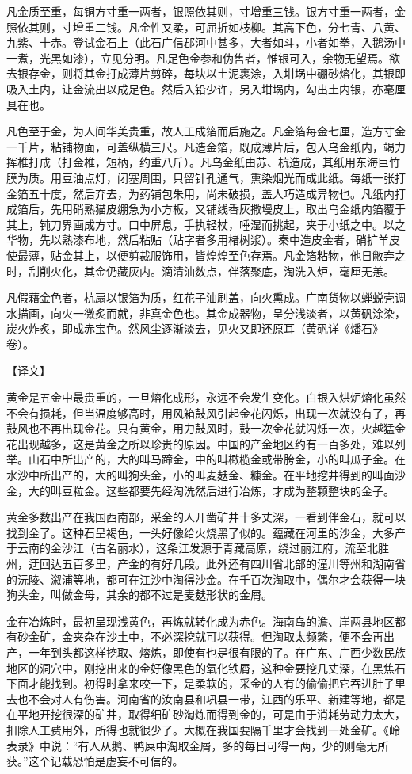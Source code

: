 \documentclass[12pt,UTF8]{ctexbook}
\begin{document}
凡金质至重，每铜方寸重一两者，银照依其则，寸增重三钱。银方寸重一两者，金照依其则，寸增重二钱。凡金性又柔，可屈折如枝柳。其高下色，分七青、八黄、九紫、十赤。登试金石上（此石广信郡河中甚多，大者如斗，小者如拳，入鹅汤中一煮，光黑如漆），立见分明。凡足色金参和伪售者，惟银可入，余物无望焉。欲去银存金，则将其金打成薄片剪碎，每块以土泥裹涂，入坩埚中硼砂熔化，其银即吸入土内，让金流出以成足色。然后入铅少许，另入坩埚内，勾出土内银，亦毫厘具在也。

凡色至于金，为人间华美贵重，故人工成箔而后施之。凡金箔每金七厘，造方寸金一千片，粘铺物面，可盖纵横三尺。凡造金箔，既成薄片后，包入乌金纸内，竭力挥椎打成（打金椎，短柄，约重八斤）。凡乌金纸由苏、杭造成，其纸用东海巨竹膜为质。用豆油点灯，闭塞周围，只留针孔通气，熏染烟光而成此纸。每纸一张打金箔五十度，然后弃去，为药铺包朱用，尚未破损，盖人巧造成异物也。凡纸内打成箔后，先用硝熟猫皮绷急为小方板，又铺线香灰撒墁皮上，取出乌金纸内箔覆于其上，钝刀界画成方寸。口中屏息，手执轻杖，唾湿而挑起，夹于小纸之中。以之华物，先以熟漆布地，然后粘贴（贴字者多用楮树浆）。秦中造皮金者，硝扩羊皮使最薄，贴金其上，以便剪裁服饰用，皆煌煌至色存焉。凡金箔粘物，他日敝弃之时，刮削火化，其金仍藏灰内。滴清油数点，伴落聚底，淘洗入炉，毫厘无恙。

凡假藉金色者，杭扇以银箔为质，红花子油刷盖，向火熏成。广南货物以蝉蜕壳调水描画，向火一微炙而就，非真金色也。其金成器物，呈分浅淡者，以黄矾涂染，炭火炸炙，即成赤宝色。然风尘逐渐淡去，见火又即还原耳（黄矾详《燔石》卷）。

【译文】

黄金是五金中最贵重的，一旦熔化成形，永远不会发生变化。白银入烘炉熔化虽然不会有损耗，但当温度够高时，用风箱鼓风引起金花闪烁，出现一次就没有了，再鼓风也不再出现金花。只有黄金，用力鼓风时，鼓一次金花就闪烁一次，火越猛金花出现越多，这是黄金之所以珍贵的原因。中国的产金地区约有一百多处，难以列举。山石中所出产的，大的叫马蹄金，中的叫橄榄金或带胯金，小的叫瓜子金。在水沙中所出产的，大的叫狗头金，小的叫麦麸金、糠金。在平地挖井得到的叫面沙金，大的叫豆粒金。这些都要先经淘洗然后进行冶炼，才成为整颗整块的金子。

黄金多数出产在我国西南部，采金的人开凿矿井十多丈深，一看到伴金石，就可以找到金了。这种石呈褐色，一头好像给火烧黑了似的。蕴藏在河里的沙金，大多产于云南的金沙江（古名丽水），这条江发源于青藏高原，绕过丽江府，流至北胜州，迂回达五百多里，产金的有好几段。此外还有四川省北部的潼川等州和湖南省的沅陵、溆浦等地，都可在江沙中淘得沙金。在千百次淘取中，偶尔才会获得一块狗头金，叫做金母，其余的都不过是麦麸形状的金屑。

金在冶炼时，最初呈现浅黄色，再炼就转化成为赤色。海南岛的澹、崖两县地区都有砂金矿，金夹杂在沙土中，不必深挖就可以获得。但淘取太频繁，便不会再出产，一年到头都这样挖取、熔炼，即使有也是很有限的了。在广东、广西少数民族地区的洞穴中，刚挖出来的金好像黑色的氧化铁屑，这种金要挖几丈深，在黑焦石下面才能找到。初得时拿来咬一下，是柔软的，采金的人有的偷偷把它吞进肚子里去也不会对人有伤害。河南省的汝南县和巩县一带，江西的乐平、新建等地，都是在平地开挖很深的矿井，取得细矿砂淘炼而得到金的，可是由于消耗劳动力太大，扣除人工费用外，所得也就很少了。大概在我国要隔千里才会找到一处金矿。《岭表录》中说：“有人从鹅、鸭屎中淘取金屑，多的每日可得一两，少的则毫无所获。”这个记载恐怕是虚妄不可信的。
\end{document}
